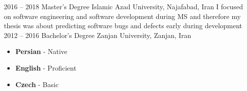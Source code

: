 \documentclass[a4paper]{developercv} %
\begin{document}

\begin{entrylist}
	\entry
	{2016 -- 2018}
	{Master's Degree}
	{Islamic Azad University, Najafabad, Iran}
	{I focused on software engineering and software development during MS and therefore my thesis was about predicting software bugs and defects early during development}
	\entry
	{2012 -- 2016}
	{Bachelor's Degree}
	{Zanjan University, Zanjan, Iran}
	{}
\end{entrylist}


\begin{itemize}
	\setlength\itemsep{3px}
	\item \textbf{Persian} - Native
	\item \textbf{English} - Proficient
    \item \textbf{Czech} - Basic
\end{itemize}
\end{document}
